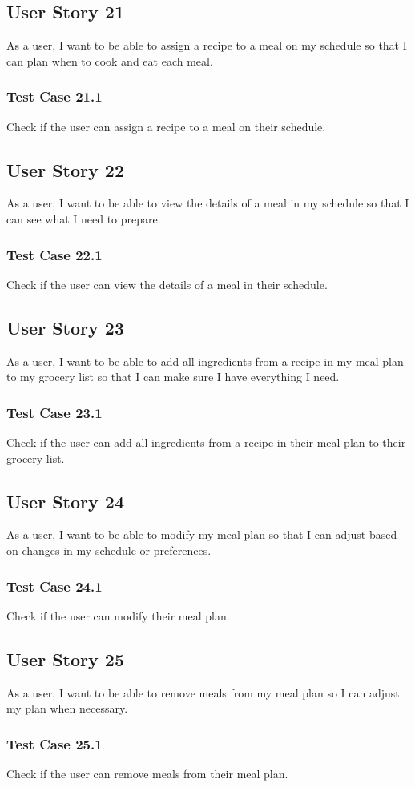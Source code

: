 \documentclass[11pt, letterpaper]{report}
\begin{document}
\subsection{User Story 21}
As a user, I want to be able to assign a recipe to a meal on my schedule so that I can plan when to cook and eat each meal.

\subsubsection{Test Case 21.1}
Check if the user can assign a recipe to a meal on their schedule.

\subsection{User Story 22}
As a user, I want to be able to view the details of a meal in my schedule so that I can see what I need to prepare.

\subsubsection{Test Case 22.1}
Check if the user can view the details of a meal in their schedule.

\subsection{User Story 23}
As a user, I want to be able to add all ingredients from a recipe in my meal plan to my grocery list so that I can make sure I have everything I need.

\subsubsection{Test Case 23.1}
Check if the user can add all ingredients from a recipe in their meal plan to their grocery list.

\subsection{User Story 24}
As a user, I want to be able to modify my meal plan so that I can adjust based on changes in my schedule or preferences.

\subsubsection{Test Case 24.1}
Check if the user can modify their meal plan.

\subsection{User Story 25}
As a user, I want to be able to remove meals from my meal plan so I can adjust my plan when necessary.

\subsubsection{Test Case 25.1}
Check if the user can remove meals from their meal plan.
\end{document}
